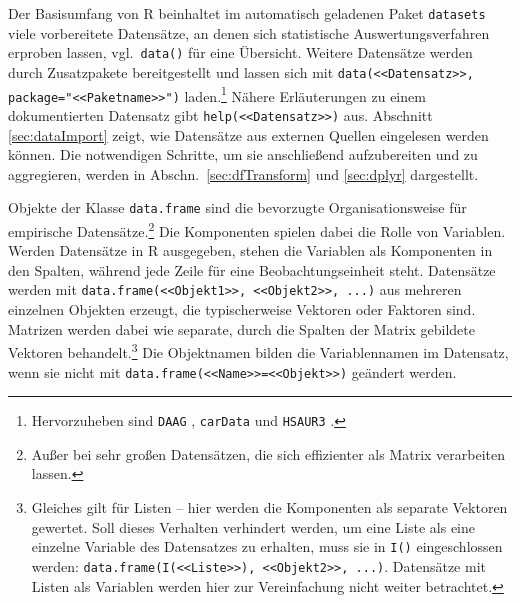 Der Basisumfang von R beinhaltet im automatisch geladenen Paket \lstinline!datasets! viele vorbereitete Datensätze, an denen sich statistische Auswertungsverfahren erproben lassen, vgl.\ \lstinline!data()! für eine Übersicht. Weitere Datensätze werden durch Zusatzpakete bereitgestellt und lassen sich mit \lstinline!data(<<Datensatz>>, package="<<Paketname>>")! laden.\footnote{Hervorzuheben sind \lstinline!DAAG! \cite{Maindonald2009}, \lstinline!carData! \cite{Fox2019} und \lstinline!HSAUR3! \cite{Everitt2011}.} Nähere Erläuterungen zu einem dokumentierten Datensatz gibt \lstinline!help(<<Datensatz>>)! aus. Abschnitt \ref{sec:dataImport} zeigt, wie Datensätze aus externen Quellen eingelesen werden können. Die notwendigen Schritte, um sie anschließend aufzubereiten und zu aggregieren, werden in Abschn.\ \ref{sec:dfTransform} und \ref{sec:dplyr} dargestellt.

Objekte der Klasse \lstinline!data.frame! sind die bevorzugte Organisationsweise für empirische Datensätze.\footnote{Außer bei sehr großen Datensätzen, die sich effizienter als Matrix verarbeiten lassen.} Die Komponenten spielen dabei die Rolle von Variablen. Werden Datensätze in R ausgegeben, stehen die Variablen als Komponenten in den Spalten, während jede Zeile für eine Beobachtungseinheit steht. Datensätze werden mit \lstinline!data.frame(<<Objekt1>>, <<Objekt2>>, ...)! aus mehreren einzelnen Objekten erzeugt, die typischerweise Vektoren oder Faktoren sind. Matrizen werden dabei wie separate, durch die Spalten der Matrix gebildete Vektoren behandelt.\footnote{Gleiches gilt für Listen -- hier werden die Komponenten als separate Vektoren gewertet. Soll dieses Verhalten verhindert werden, um eine Liste als eine einzelne Variable des Datensatzes zu erhalten, muss sie in \lstinline!I()! eingeschlossen werden: \lstinline!data.frame(I(<<Liste>>), <<Objekt2>>, ...)!. Datensätze mit Listen als Variablen werden hier zur Vereinfachung nicht weiter betrachtet.} Die Objektnamen bilden die Variablennamen im Datensatz, wenn sie nicht mit \lstinline!data.frame(<<Name>>=<<Objekt>>)! geändert werden.


